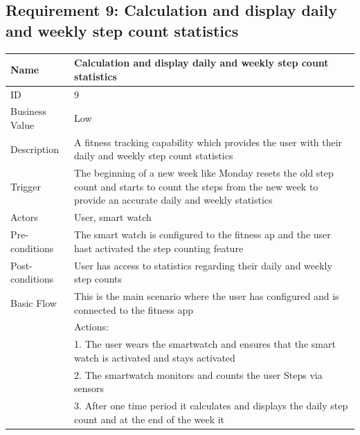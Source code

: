 \documentclass{article}
\begin{document}
	\subsection{Requirement 9: Calculation and display daily and weekly step count statistics}
			
		\begin{table}[h]
			\centering
			\captionsetup{labelformat=empty}
			\begin{tabularx}{\textwidth}{|>{\raggedright\arraybackslash}p{}|X|}
				\hline
				Name             & Calculation and display daily and weekly step count statistics                                \\ \hline
				ID               & 9                                                                                       \\ \hline
				Business Value   & Low                                                                                    \\ \hline
				Description      & A fitness tracking capability which provides the user with their daily and weekly step count statistics \\ \hline
				Trigger          & The beginning of a new week like Monday resets the old step count and starts to count the steps from the new week to provide an accurate daily and weekly statistics \\ \hline
				Actors           & User, smart watch                                 \\ \hline
				Pre-conditions   & The smart watch is configured to the fitness ap and the user hast activated the step counting feature                                    \\ \hline
				Post-conditions  & User has access to statistics regarding their daily and weekly step counts                                                         \\ \hline
				Basic Flow       & This is the main scenario where the user has configured and is connected to the fitness app \\ \hline
								 & Actions: \\
								 & 1. The user wears the smartwatch and ensures that the smart watch is activated and stays activated \\
								 & 2. The smartwatch monitors and counts the user Steps via sensors \\
								 & 3. After one time period it calculates and displays the daily step count and at the end of the week it \\ \hline

\end{tabularx}
\end{table}
\end{document}
